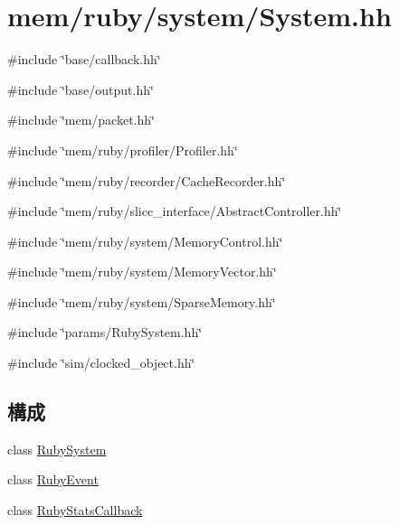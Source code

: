 \hypertarget{System_8hh}{
\section{mem/ruby/system/System.hh}
\label{System_8hh}
}
{\ttfamily \#include \char`\"{}base/callback.hh\char`\"{}}\par
{\ttfamily \#include \char`\"{}base/output.hh\char`\"{}}\par
{\ttfamily \#include \char`\"{}mem/packet.hh\char`\"{}}\par
{\ttfamily \#include \char`\"{}mem/ruby/profiler/Profiler.hh\char`\"{}}\par
{\ttfamily \#include \char`\"{}mem/ruby/recorder/CacheRecorder.hh\char`\"{}}\par
{\ttfamily \#include \char`\"{}mem/ruby/slicc\_\-interface/AbstractController.hh\char`\"{}}\par
{\ttfamily \#include \char`\"{}mem/ruby/system/MemoryControl.hh\char`\"{}}\par
{\ttfamily \#include \char`\"{}mem/ruby/system/MemoryVector.hh\char`\"{}}\par
{\ttfamily \#include \char`\"{}mem/ruby/system/SparseMemory.hh\char`\"{}}\par
{\ttfamily \#include \char`\"{}params/RubySystem.hh\char`\"{}}\par
{\ttfamily \#include \char`\"{}sim/clocked\_\-object.hh\char`\"{}}\par
\subsection*{構成}
\begin{DoxyCompactItemize}
\item 
class \hyperlink{classRubySystem}{RubySystem}
\item 
class \hyperlink{classRubySystem_1_1RubyEvent}{RubyEvent}
\item 
class \hyperlink{classRubyStatsCallback}{RubyStatsCallback}
\end{DoxyCompactItemize}
